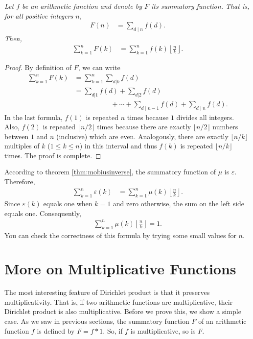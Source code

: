 \documentclass[12pt]{subfile}
\begin{document}
		\begin{theorem}\slshape\label{thm:sum-of-sum-function}
			Let $f$ be an arithmetic function and denote by $F$ its summatory function. That is, for all positive integers $n$,
				\begin{align*}
					F(n) &= \sum_{d\mid n} f(d).
				\end{align*}
			Then,
				\begin{align*}
					\sum_{k=1}^{n} F(k) &= \sum_{k=1}^{n} f(k) \left\lfloor \frac{n}{k}\right\rfloor.
				\end{align*}
		\end{theorem}

		\begin{proof}
			By definition of $F$, we can write
				\begin{align*}
					\sum_{k=1}^{n} F(k) &= \sum_{k=1}^{n} \sum_{d|k} f(d)\\
										&= \sum_{d|1} f(d) + \sum_{d|2} f(d)\\ &\phantom{=} \qquad \qquad +\cdots + \sum_{d\mid n-1} f(d)+\sum_{d\mid n} f(d).
				\end{align*}
			In the last formula, $f(1)$ is repeated $n$ times because $1$ divides all integers. Also, $f(2)$ is repeated $\lfloor n/2 \rfloor$ times because there are exactly $\lfloor n/2 \rfloor$ numbers between $1$ and $n$ (inclusive) which are even. Analogously, there are exactly $\lfloor n/k \rfloor$ multiples of $k$ ($1 \leq k \leq n$) in this interval and thus $f(k)$ is repeated $\lfloor n/k \rfloor$ times. The proof is complete.
		\end{proof}

		\begin{example}
			According to theorem \ref{thm:mobiusinverse}, the summatory function of $\mu$ is $\varepsilon$. Therefore,
				\begin{align*}
					\sum_{k=1}^{n} \varepsilon(k) &= \sum_{k=1}^{n} \mu(k) \left\lfloor \frac{n}{k}\right\rfloor.
				\end{align*}
			Since $\varepsilon(k)$ equals one when $k=1$ and zero otherwise, the sum on the left side equals one. Consequently,
				\begin{align*}
					\sum_{k=1}^{n} \mu(k) \left\lfloor \frac{n}{k}\right\rfloor = 1.
				\end{align*}
			You can check the correctness of this formula by trying some small values for $n$.
		\end{example}


\section{More on Multiplicative Functions}
The most interesting feature of Dirichlet product is that it preserves multiplicativity. That is, if two arithmetic functions are multiplicative, their Dirichlet product is also multiplicative. Before we prove this, we show a simple case. As we saw in previous sections, the summatory function $F$ of an arithmetic function $f$ is defined by $F=f\ast 1$. So, if $f$ is multiplicative, so is $F$.
\end{document}
